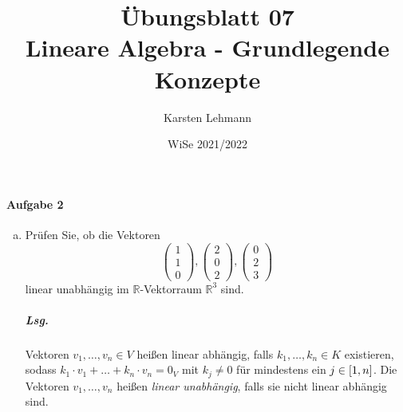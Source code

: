 \documentclass{scrreprt}
\author{Karsten Lehmann}
\date{WiSe 2021/2022}
\title{Übungsblatt 07\\Lineare Algebra - Grundlegende Konzepte}
\begin{document}
\paragraph{Aufgabe 2}
\begin{enumerate}[(a)]
\item Prüfen Sie, ob die Vektoren
  \[
    \begin{pmatrix}1 \\ 1 \\ 0\end{pmatrix},
    \begin{pmatrix}2 \\ 0 \\ 2\end{pmatrix},
    \begin{pmatrix}0 \\ 2 \\ 3\end{pmatrix}
  \]
  linear unabhängig im $\mathbb{R}$-Vektorraum
  $\mathbb{R}^3$ sind.

  \subparagraph{Lsg.} Vektoren $v_1, \ldots, v_n \in V$ heißen linear abhängig,
  falls $k_1, \ldots, k_n \in K$ existieren, sodass
  $k_1 \cdot v_1 + \ldots + k_n \cdot v_n = 0_V$ mit $k_j \ne 0$ für mindestens
  ein $j \in \qty[1, n]$.
  Die Vektoren $v_1, \ldots, v_n$ heißen \emph{linear unabhängig}, falls sie
  nicht linear abhängig sind.


\end{enumerate}
\end{document}

